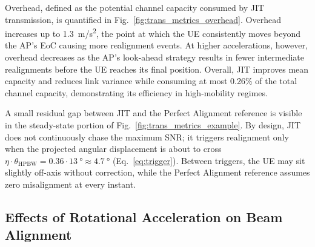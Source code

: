 \documentclass[fleqn,10pt]{wlscirep}
\begin{document}
Overhead, defined as the potential channel capacity consumed by JIT transmission, is quantified in Fig.~\ref{fig:trans_metrics_overhead}. Overhead increases up to \SI{1.3}{m/s^2}, the point at which the UE consistently moves beyond the AP's EoC causing more realignment events. At higher accelerations, however, overhead decreases as the AP's look-ahead strategy results in fewer intermediate realignments before the UE reaches its final position. Overall, JIT improves mean capacity and reduces link variance while consuming at most 0.26\% of the total channel capacity, demonstrating its efficiency in high-mobility regimes.

A small residual gap between JIT and the Perfect Alignment reference is visible in the steady-state portion of Fig.~\ref{fig:trans_metrics_example}. By design, JIT does not continuously chase the maximum SNR; it triggers realignment only when the projected angular displacement is about to cross $\eta \cdot \theta_{\text{HPBW}} = 0.36 \cdot \SI{13}{\degree} \approx \SI{4.7}{\degree}$ (Eq.~\ref{eq:trigger}). Between triggers, the UE may sit slightly off-axis without correction, while the Perfect Alignment reference assumes zero misalignment at every instant.



\subsection*{Effects of Rotational Acceleration on Beam Alignment}
\end{document}
